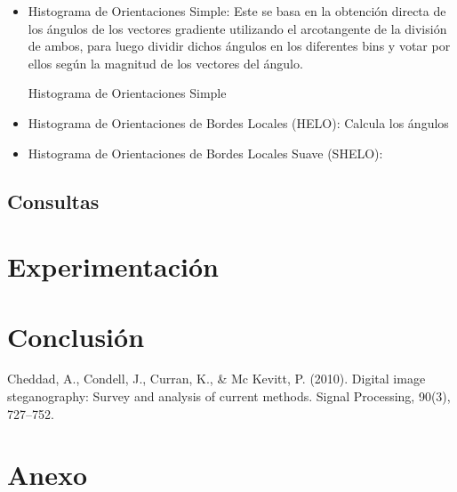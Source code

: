 \documentclass[conference]{IEEEtran}
\begin{document}
	\begin{itemize}

	\item Histograma de Orientaciones Simple:
	Este se basa en la obtención directa de los ángulos de los vectores gradiente utilizando el arcotangente de la división de ambos, para luego dividir dichos ángulos en los diferentes bins y votar por ellos según la magnitud de los vectores del ángulo.
	\begin{algorithm}[ht]
		\caption{Histograma de Orientaciones Simple}	
		\DontPrintSemicolon
		
		\end{algorithm} 
	
	\item Histograma de Orientaciones de Bordes Locales (HELO): Calcula los ángulos 
	
	\item Histograma de Orientaciones de Bordes Locales Suave (SHELO): 	
	
	\end{itemize}	    
\subsection*{Consultas}
	
	
\section*{Experimentación}
    

\section*{Conclusión}
    


\begin{thebibliography}{99}
 Cheddad, A., Condell, J., Curran, K., \& Mc Kevitt, P. (2010). Digital image 
steganography: Survey and analysis of current methods. Signal Processing, 90(3), 727–752. 


\end{thebibliography}

\section*{Anexo}
\end{document}
